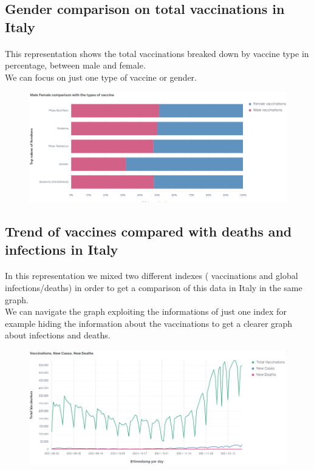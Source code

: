 \documentclass[a4paper,12pt]{article}
\begin{document}
\subsection{Gender comparison on total vaccinations in Italy}

\paragraph{}This representation shows the total vaccinations breaked down by vaccine type in percentage, between male and female. \\
We can focus on just one type of vaccine or gender.
\begin{figure}[h]
	\centering
  \includegraphics[width=\linewidth]{dashboards/dash4.png}
\end{figure}

\subsection{Trend of vaccines compared with deaths and infections in Italy}

\paragraph{}In this representation we mixed two different indexes ( vaccinations and global infections/deaths) in order to get a comparison of this data in Italy in the same graph.
\\
We can navigate the graph exploiting the informations of just one index for example hiding the information about the vaccinations to get a clearer graph about infections and deaths.
\begin{figure}[h]
	\centering
  \includegraphics[width=\linewidth]{dashboards/dash5.png}
\end{figure}
\clearpage
\end{document}
